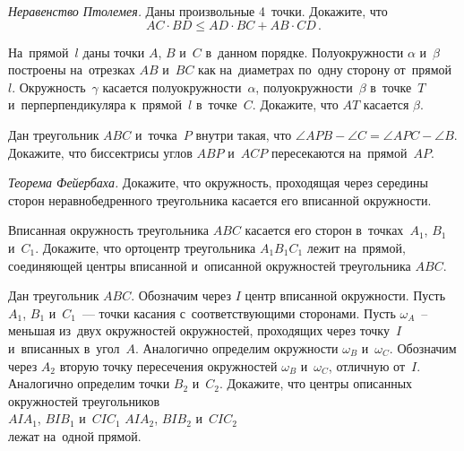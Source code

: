 \begin{problems}
\item \emph{Неравенство Птолемея.}\enspace
Даны произвольные 4~точки.
Докажите, что
\[
    AC \cdot BD
\leq
    AD \cdot BC + AB \cdot CD
\, . \]

\item
На~прямой~$l$ даны точки $A$, $B$ и~$C$ в~данном порядке.
Полуокружности $\alpha$ и~$\beta$ построены на~отрезках $AB$ и~$BC$ как
на~диаметрах по~одну сторону от~прямой~$l$.
Окружность~$\gamma$ касается полуокружности~$\alpha$, полуокружности~$\beta$
в~точке~$T$ и~перперпендикуляра к~прямой~$l$ в~точке~$C$.
Докажите, что $AT$ касается $\beta$.

\item
Дан треугольник $ABC$ и~точка~$P$ внутри такая, что
$\angle APB - \angle C = \angle APC - \angle B$.
Докажите, что биссектрисы углов $ABP$ и~$ACP$ пересекаются на~прямой~$AP$.

\item \emph{Теорема Фейербаха.}\enspace
Докажите, что окружность, проходящая через середины сторон неравнобедренного
треугольника касается его вписанной окружности.

\item
Вписанная окружность треугольника $ABC$ касается его сторон в~точках~$A_1$,
$B_1$ и~$C_1$.
Докажите, что ортоцентр треугольника $A_1 B_1 C_1$ лежит на~прямой, соединяющей
центры вписанной и~описанной окружностей треугольника $ABC$.

\item
Дан треугольник $ABC$.
Обозначим через $I$ центр вписанной окружности.
Пусть $A_1$, $B_1$ и~$C_1$~--- точки касания с~соответствующими сторонами.
Пусть $\omega_A$~-- меньшая из~двух окружностей окружностей, проходящих через
точку~$I$ и~вписанных в~угол~$A$.
Аналогично определим окружности $\omega_B$ и~$\omega_C$.
Обозначим через $A_2$ вторую точку пересечения окружностей $\omega_B$
и~$\omega_C$, отличную от~$I$.
Аналогично определим точки $B_2$ и~$C_2$.
Докажите, что центры описанных окружностей треугольников
\\
\subproblem $A I A_1$, $B I B_1$ и~$C I C_1$
\qquad
\subproblem $A I A_2$, $B I B_2$ и~$C I C_2$
\\
лежат на~одной прямой.

\end{problems}

